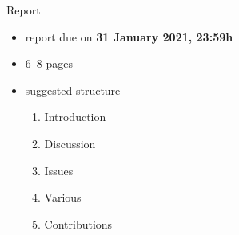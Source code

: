 \begin{frame}{Report}
  \begin{itemize}
    \item report due on \textbf{31 January 2021, 23:59h}
    \item 6--8 pages
    \item suggested structure
    \begin{enumerate}
      \item Introduction
      \item Discussion
      \item Issues
      \item Various
      \item Contributions
    \end{enumerate}
  \end{itemize}
\end{frame}